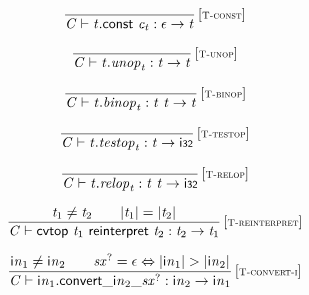 \vspace{1ex}

$$
\begin{array}{@{}c@{}}\displaystyle
\frac{
}{
{\mathit{C}} \vdash {\mathit{t}}.\mathsf{const}~{\mathit{c}}_{{\mathit{t}}} : \epsilon \rightarrow {\mathit{t}}
} \, {[\textsc{\scriptsize T{-}const}]}
\qquad
\end{array}
$$

$$
\begin{array}{@{}c@{}}\displaystyle
\frac{
}{
{\mathit{C}} \vdash {\mathit{t}} . {\mathit{unop}}_{{\mathit{t}}} : {\mathit{t}} \rightarrow {\mathit{t}}
} \, {[\textsc{\scriptsize T{-}unop}]}
\qquad
\end{array}
$$

$$
\begin{array}{@{}c@{}}\displaystyle
\frac{
}{
{\mathit{C}} \vdash {\mathit{t}} . {\mathit{binop}}_{{\mathit{t}}} : {\mathit{t}}~{\mathit{t}} \rightarrow {\mathit{t}}
} \, {[\textsc{\scriptsize T{-}binop}]}
\qquad
\end{array}
$$

$$
\begin{array}{@{}c@{}}\displaystyle
\frac{
}{
{\mathit{C}} \vdash {\mathit{t}} . {\mathit{testop}}_{{\mathit{t}}} : {\mathit{t}} \rightarrow \mathsf{i{\scriptstyle32}}
} \, {[\textsc{\scriptsize T{-}testop}]}
\qquad
\end{array}
$$

$$
\begin{array}{@{}c@{}}\displaystyle
\frac{
}{
{\mathit{C}} \vdash {\mathit{t}} . {\mathit{relop}}_{{\mathit{t}}} : {\mathit{t}}~{\mathit{t}} \rightarrow \mathsf{i{\scriptstyle32}}
} \, {[\textsc{\scriptsize T{-}relop}]}
\qquad
\end{array}
$$

\vspace{1ex}

$$
\begin{array}{@{}c@{}}\displaystyle
\frac{
{\mathit{t}}_{{1}} \neq {\mathit{t}}_{{2}}
 \qquad
{|{\mathit{t}}_{{1}}|} = {|{\mathit{t}}_{{2}}|}
}{
{\mathit{C}} \vdash \mathsf{cvtop}~{\mathit{t}}_{{1}}~\mathsf{reinterpret}~{\mathit{t}}_{{2}} : {\mathit{t}}_{{2}} \rightarrow {\mathit{t}}_{{1}}
} \, {[\textsc{\scriptsize T{-}reinterpret}]}
\qquad
\end{array}
$$

$$
\begin{array}{@{}c@{}}\displaystyle
\frac{
{{\mathsf{i}}{{\mathit{n}}}}_{{1}} \neq {{\mathsf{i}}{{\mathit{n}}}}_{{2}}
 \qquad
{{\mathit{sx}}^?} = \epsilon \Leftrightarrow {|{{\mathsf{i}}{{\mathit{n}}}}_{{1}}|} > {|{{\mathsf{i}}{{\mathit{n}}}}_{{2}}|}
}{
{\mathit{C}} \vdash {{\mathsf{i}}{{\mathit{n}}}}_{{1}} . {{{{\mathsf{convert}}{\mathsf{\_}}}{{{\mathsf{i}}{{\mathit{n}}}}_{{2}}}}{\mathsf{\_}}}{{{\mathit{sx}}^?}} : {{\mathsf{i}}{{\mathit{n}}}}_{{2}} \rightarrow {{\mathsf{i}}{{\mathit{n}}}}_{{1}}
} \, {[\textsc{\scriptsize T{-}convert{-}i}]}
\qquad
\end{array}
$$


